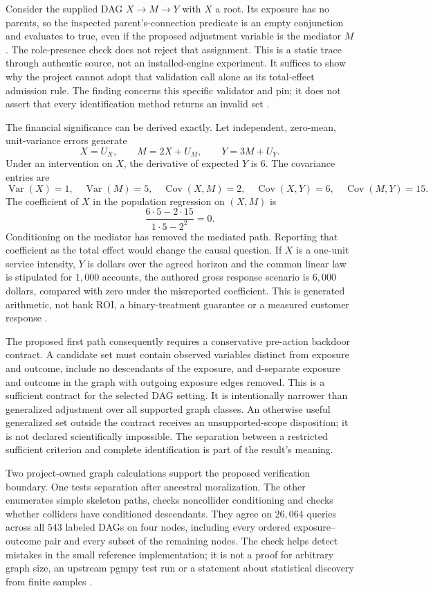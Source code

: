 Consider the supplied DAG $X\to M\to Y$ with $X$ a root. Its exposure
has no parents, so the inspected parent's-connection predicate is an empty
conjunction and evaluates to true, even if the proposed adjustment variable
is the mediator $M$. The role-presence check does not reject that assignment.
This is a static trace through authentic source, not an installed-engine
experiment. It suffices to show why the project cannot adopt that validation
call alone as its total-effect admission rule. The finding concerns this
specific validator and pin; it does not assert that every identification
method returns an invalid set
\citep{exec13_pgmpy_reuse_primary,exec13_pgmpy_reuse_oracle}.

The financial significance can be derived exactly. Let independent,
zero-mean, unit-variance errors generate
\[
 X=U_X,\qquad M=2X+U_M,\qquad Y=3M+U_Y.
\]
Under an intervention on $X$, the derivative of expected $Y$ is $6$.
The covariance entries are
\[
 \operatorname{Var}(X)=1,\quad \operatorname{Var}(M)=5,\quad
 \operatorname{Cov}(X,M)=2,\quad
 \operatorname{Cov}(X,Y)=6,\quad \operatorname{Cov}(M,Y)=15.
\]
The coefficient of $X$ in the population regression on $(X,M)$ is
\[
 \frac{6\cdot5-2\cdot15}{1\cdot5-2^2}=0.
\]
Conditioning on the mediator has removed the mediated path. Reporting that
coefficient as the total effect would change the causal question. If $X$
is a one-unit service intensity, $Y$ is dollars over the agreed horizon and
the common linear law is stipulated for $1{,}000$ accounts, the authored
gross response scenario is $6{,}000$ dollars, compared with zero under the
misreported coefficient. This is generated arithmetic, not bank ROI, a
binary-treatment guarantee or a measured customer response
\citep{exec13_pgmpy_reuse_oracle}.

The proposed first path consequently requires a conservative pre-action
backdoor contract. A candidate set must contain observed variables distinct
from exposure and outcome, include no descendants of the exposure, and
d-separate exposure and outcome in the graph with outgoing exposure edges
removed. This is a sufficient contract for the selected DAG setting. It
is intentionally narrower than generalized adjustment over all supported
graph classes. An otherwise useful generalized set outside the contract
receives an unsupported-scope disposition; it is not declared scientifically
impossible. The separation between a restricted sufficient criterion and
complete identification is part of the result's meaning.

Two project-owned graph calculations support the proposed verification
boundary. One tests separation after ancestral moralization. The other
enumerates simple skeleton paths, checks noncollider conditioning and checks
whether colliders have conditioned descendants. They agree on $26{,}064$
queries across all $543$ labeled DAGs on four nodes, including every ordered
exposure--outcome pair and every subset of the remaining nodes. The check
helps detect mistakes in the small reference implementation; it is not a
proof for arbitrary graph size, an upstream pgmpy test run or a statement
about statistical discovery from finite samples
\citep{exec13_pgmpy_reuse_oracle}.

